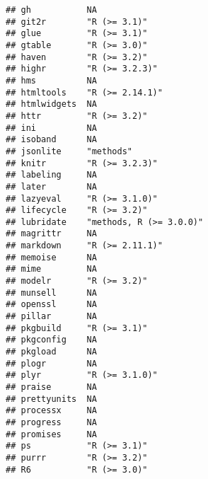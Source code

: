 \documentclass[]{book}
\begin{document}
\begin{verbatim}
## gh           NA                                               
## git2r        "R (>= 3.1)"                                     
## glue         "R (>= 3.1)"                                     
## gtable       "R (>= 3.0)"                                     
## haven        "R (>= 3.2)"                                     
## highr        "R (>= 3.2.3)"                                   
## hms          NA                                               
## htmltools    "R (>= 2.14.1)"                                  
## htmlwidgets  NA                                               
## httr         "R (>= 3.2)"                                     
## ini          NA                                               
## isoband      NA                                               
## jsonlite     "methods"                                        
## knitr        "R (>= 3.2.3)"                                   
## labeling     NA                                               
## later        NA                                               
## lazyeval     "R (>= 3.1.0)"                                   
## lifecycle    "R (>= 3.2)"                                     
## lubridate    "methods, R (>= 3.0.0)"                          
## magrittr     NA                                               
## markdown     "R (>= 2.11.1)"                                  
## memoise      NA                                               
## mime         NA                                               
## modelr       "R (>= 3.2)"                                     
## munsell      NA                                               
## openssl      NA                                               
## pillar       NA                                               
## pkgbuild     "R (>= 3.1)"                                     
## pkgconfig    NA                                               
## pkgload      NA                                               
## plogr        NA                                               
## plyr         "R (>= 3.1.0)"                                   
## praise       NA                                               
## prettyunits  NA                                               
## processx     NA                                               
## progress     NA                                               
## promises     NA                                               
## ps           "R (>= 3.1)"                                     
## purrr        "R (>= 3.2)"                                     
## R6           "R (>= 3.0)"                                     

\end{verbatim}
\end{document}
